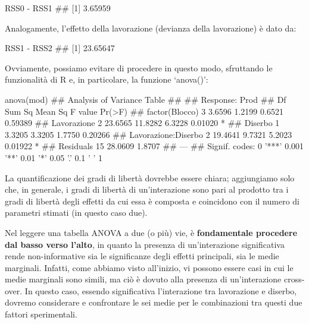 \documentclass[a4paper,12pt,oneside]{book}
\newenvironment{Shaded}{}{}
\newcommand{\KeywordTok}[1]{#1}
\newcommand{\StringTok}[1]{#1}
\newcommand{\CommentTok}[1]{#1}
\newcommand{\OperatorTok}[1]{#1}
\newcommand{\NormalTok}[1]{#1}
\begin{document}
\begin{Shaded}
\begin{Highlighting}[]
\NormalTok{RSS0 }\OperatorTok{-}\StringTok{ }\NormalTok{RSS1}
\CommentTok{## [1] 3.65959}
\end{Highlighting}
\end{Shaded}

Analogamente, l'effetto della lavorazione (devianza della lavorazione) è dato da:

\begin{Shaded}
\begin{Highlighting}[]
\NormalTok{RSS1 }\OperatorTok{-}\StringTok{ }\NormalTok{RSS2}
\CommentTok{## [1] 23.65647}
\end{Highlighting}
\end{Shaded}

Ovviamente, possiamo evitare di procedere in questo modo, sfruttando le funzionalità di R e, in particolare, la funzione `anova()':

\footnotesize

\begin{Shaded}
\begin{Highlighting}[]
\KeywordTok{anova}\NormalTok{(mod)}
\CommentTok{## Analysis of Variance Table}
\CommentTok{## }
\CommentTok{## Response: Prod}
\CommentTok{##                     Df  Sum Sq Mean Sq F value  Pr(>F)  }
\CommentTok{## factor(Blocco)       3  3.6596  1.2199  0.6521 0.59389  }
\CommentTok{## Lavorazione          2 23.6565 11.8282  6.3228 0.01020 *}
\CommentTok{## Diserbo              1  3.3205  3.3205  1.7750 0.20266  }
\CommentTok{## Lavorazione:Diserbo  2 19.4641  9.7321  5.2023 0.01922 *}
\CommentTok{## Residuals           15 28.0609  1.8707                  }
\CommentTok{## ---}
\CommentTok{## Signif. codes:  0 '***' 0.001 '**' 0.01 '*' 0.05 '.' 0.1 ' ' 1}
\end{Highlighting}
\end{Shaded}

\normalsize

La quantificazione dei gradi di libertà dovrebbe essere chiara; aggiungiamo solo che, in generale, i gradi di libertà di un'interazione sono pari al prodotto tra i gradi di libertà degli effetti da cui essa è composta e coincidono con il numero di parametri stimati (in questo caso due).

Nel leggere una tabella ANOVA a due (o più) vie, è \textbf{fondamentale procedere dal basso verso l'alto}, in quanto la presenza di un'interazione significativa rende non-informative sia le significanze degli effetti principali, sia le medie marginali. Infatti, come abbiamo visto all'inizio, vi possono essere casi in cui le medie marginali sono simili, ma ciò è dovuto alla presenza di un'interazione cross-over. In questo caso, essendo significativa l'interazione tra lavorazione e diserbo, dovremo considerare e confrontare le sei medie per le combinazioni tra questi due fattori sperimentali.
\end{document}
